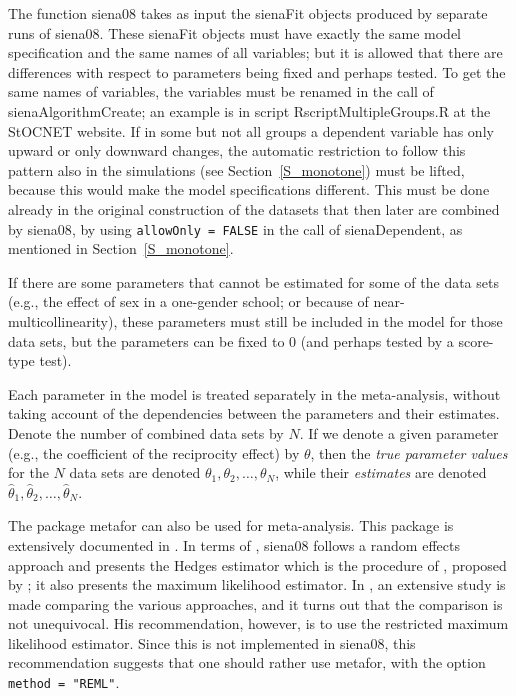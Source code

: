 \documentclass[a4paper,fleqn,11pt]{article}
\newcommand{\+}{\, + \,}
\newcommand{\sfn}[1]{\textsf{#1}}
\newcommand{\SN}{{\sf StOCNET }}
\begin{document}
The function  \textsf{siena08} takes as input the \textsf{sienaFit}
objects produced by separate runs of  \textsf{siena08}.
These \textsf{sienaFit} objects must have exactly the same model
specification and the same names of all variables; but it is allowed
that there are differences with respect to parameters being fixed
and perhaps tested. To get the same names of variables, the
variables must be renamed in the call of \textsf{sienaAlgorithmCreate};
an example is in script \textsf{RscriptMultipleGroups.R} at the \SN website.
If in some but not all groups a dependent variable has only upward or
only downward changes, the automatic restriction to follow this pattern also
in the simulations (see Section~\ref{S_monotone}) must be lifted,
because this would make the model specifications different.
This must be done already in the original construction of the datasets that
then later are combined by \textsf{siena08},
by using \texttt{allowOnly = FALSE} in the call of \textsf{sienaDependent},
as mentioned in Section~\ref{S_monotone}.

If there are some parameters that cannot be estimated for some of the data sets
(e.g., the effect of sex in a one-gender school; or because of
near-multicollinearity), these parameters must still be included
in the model for those data sets, but the parameters can be fixed to 0
(and perhaps tested by a score-type test).
\medskip

Each parameter in the model is treated separately
in the meta-analysis, without taking account of the
dependencies between the parameters and their estimates.
Denote the number of combined data sets by $N$.
If we denote a given parameter (e.g., the
coefficient of the reciprocity effect) by $\theta$,
then the \emph{true parameter values} for the
$N$ data sets are denoted $\theta_1, \theta_2, \ldots, \theta_N$,
while their \emph{estimates} are denoted
 $\hat\theta_1, \hat\theta_2, \ldots, \hat\theta_N$.
 \bigskip

The package \sfn{metafor} can also be used for meta-analysis.
This package is extensively documented in \citet{Viechtbauer2010}.
In terms of \citet{Viechtbauer2010}, \sfn{siena08} follows a
random effects approach and presents the Hedges estimator
which is the procedure of \citet{SnijdersBaerveldt03}, proposed
by \citet{Cochran54}; it also presents the maximum likelihood
estimator.
In \citet{Viechtbauer2005}, an extensive study is made comparing
the various approaches, and it turns out that the comparison is
not unequivocal. His recommendation, however, is to use the
restricted maximum likelihood estimator.
Since this is not implemented in \sfn{siena08}, this recommendation
suggests that one should rather use  \sfn{metafor}, with the
option \texttt{method = "REML"}.
\end{document}
